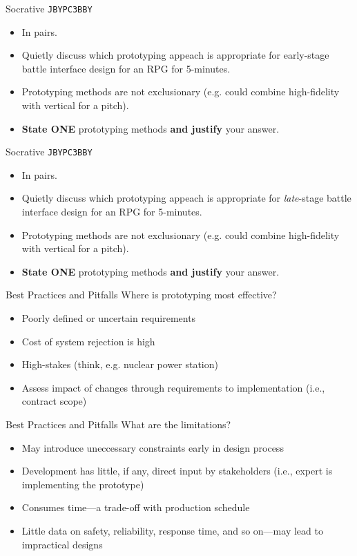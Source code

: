 \begin{frame}[fragile]{Socrative \texttt{JBYPC3BBY}}
	\begin{itemize}
		\item In pairs.
		\item Quietly discuss which prototyping appeach is appropriate for early-stage battle interface design for an RPG for 5-minutes.
		\item Prototyping methods are not exclusionary (e.g. could combine high-fidelity with vertical for a pitch).
		\item \textbf{State ONE} prototyping methods \textbf{and justify} your answer.
	\end{itemize}
\end{frame}

\begin{frame}[fragile]{Socrative \texttt{JBYPC3BBY}}
	\begin{itemize}
		\item In pairs.
		\item Quietly discuss which prototyping appeach is appropriate for \textit{late}-stage battle interface design for an RPG for 5-minutes.
		\item Prototyping methods are not exclusionary (e.g. could combine high-fidelity with vertical for a pitch).
		\item \textbf{State ONE} prototyping methods \textbf{and justify} your answer.
	\end{itemize}
\end{frame}

\begin{frame}{Best Practices and Pitfalls}
	Where is prototyping most effective?

	\begin{itemize}
		\item Poorly defined or uncertain requirements
		\item Cost of system rejection is high
		\item High-stakes (think, e.g. nuclear power station)
		\item Assess impact of changes through requirements to implementation (i.e., contract scope)
	\end{itemize}
\end{frame}

\begin{frame}{Best Practices and Pitfalls}
	What are the limitations?

	\begin{itemize}
		\item May introduce uneccessary constraints early in design process
		\item Development has little, if any, direct input by stakeholders (i.e., expert is implementing the prototype)
		\item Consumes time---a trade-off with production schedule
		\item Little data on safety, reliability, response time, and so on---may lead to impractical designs
	\end{itemize}
\end{frame}

